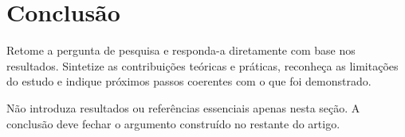 \section{Conclusão}
\label{sec:conclusao}

Retome a pergunta de pesquisa e responda-a diretamente com base nos resultados.
Sintetize as contribuições teóricas e práticas, reconheça as limitações do
estudo e indique próximos passos coerentes com o que foi demonstrado.

Não introduza resultados ou referências essenciais apenas nesta seção. A
conclusão deve fechar o argumento construído no restante do artigo.

